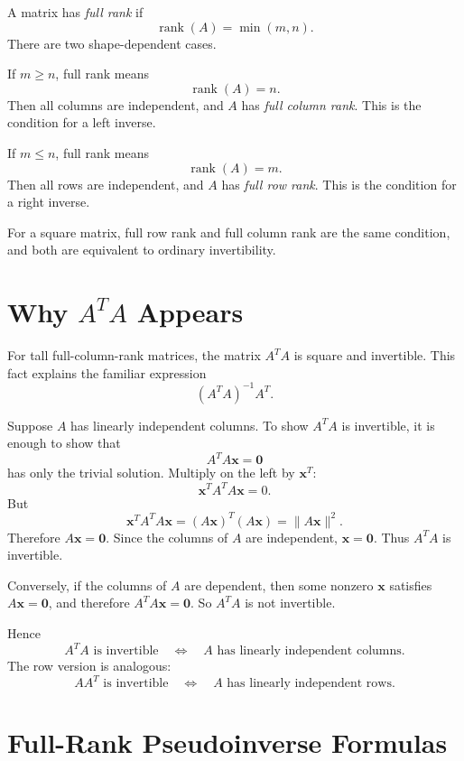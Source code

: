 A matrix has \emph{full rank} if
\[
    \operatorname{rank}(A)=\min(m,n).
\]
\label{mf:full-rank}
There are two shape-dependent cases.

If \(m\geq n\), full rank means
\[
    \operatorname{rank}(A)=n.
\]
Then all columns are independent, and \(A\) has \emph{full column rank}. This is the condition for a left inverse.
\label{mf:full-column-rank}

If \(m\leq n\), full rank means
\[
    \operatorname{rank}(A)=m.
\]
Then all rows are independent, and \(A\) has \emph{full row rank}. This is the condition for a right inverse.
\label{mf:full-row-rank}

For a square matrix, full row rank and full column rank are the same condition, and both are equivalent to ordinary invertibility.

\section[Why A-Transpose-A Appears]{Why \(A^TA\) Appears}
\label{mf:ata-invertibility}

For tall full-column-rank matrices, the matrix \(A^TA\) is square and invertible. This fact explains the familiar expression
\[
    (A^TA)^{-1}A^T.
\]

Suppose \(A\) has linearly independent columns. To show \(A^TA\) is invertible, it is enough to show that
\[
    A^TA\mathbf{x}=\mathbf{0}
\]
has only the trivial solution. Multiply on the left by \(\mathbf{x}^T\):
\[
    \mathbf{x}^TA^TA\mathbf{x}=0.
\]
But
\[
    \mathbf{x}^TA^TA\mathbf{x}=(A\mathbf{x})^T(A\mathbf{x})=\|A\mathbf{x}\|^2.
\]
Therefore \(A\mathbf{x}=\mathbf{0}\). Since the columns of \(A\) are independent, \(\mathbf{x}=\mathbf{0}\). Thus \(A^TA\) is invertible.

Conversely, if the columns of \(A\) are dependent, then some nonzero \(\mathbf{x}\) satisfies \(A\mathbf{x}=\mathbf{0}\), and therefore \(A^TA\mathbf{x}=\mathbf{0}\). So \(A^TA\) is not invertible.

Hence
\[
    A^TA \text{ is invertible}
    \quad\Longleftrightarrow\quad
    A \text{ has linearly independent columns.}
\]
The row version is analogous:
\[
    AA^T \text{ is invertible}
    \quad\Longleftrightarrow\quad
    A \text{ has linearly independent rows.}
\]
\label{mf:aat-invertibility}

\section{Full-Rank Pseudoinverse Formulas}
\label{mf:pseudoinverse}
\label{mf:pseudoinverse-full-rank}
\label{mf:pseudoinverse-left}
\label{mf:pseudoinverse-right}
\label{mf:left-pseudoinverse}
\label{mf:right-pseudoinverse}

